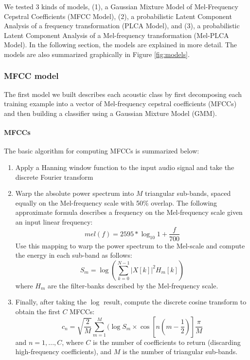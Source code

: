 We tested 3 kinds of models, (1), a Gaussian Mixture Model of Mel-Frequency Cepstral Coefficients (MFCC Model), (2), a probabilistic Latent Component Analysis of a frequency transformation (PLCA Model), and (3), a probabilistic Latent Component Analysis of a Mel-frequency transformation (Mel-PLCA Model).  In the following section, the models are explained in more detail.  The models are also summarized graphically in Figure \ref{fig:models}.

\subsubsection{MFCC model}
The first model we built describes each acoustic class by first decomposing each training example into a vector of Mel-frequency cepstral coefficients (MFCCs) and then building a classifier using a Gaussian Mixture Model (GMM).  

\paragraph{MFCCs}
The basic algorithm for computing MFCCs is summarized below:

\begin{enumerate}
\item Apply a Hanning window function to the input audio signal and take the discrete Fourier transform
\item Warp the absolute power spectrum into $M$ triangular sub-bands, spaced equally on the Mel-frequency scale with 50\% overlap.   The following approximate formula describes a frequency on the Mel-frequency scale given an input linear frequency:
\begin{equation}
mel(f) = 2595*\log_{10}{1+\frac{f}{700}}
\end{equation}
Use this mapping to warp the power spectrum to the Mel-scale and compute the energy in each sub-band as follows:
\begin{equation}
S_m = \log{\left(\sum_{k=0}^{N-1}|X[k]|^2H_m[k]\right)}
\end{equation}
where $H_m$ are the filter-banks described by the Mel-frequency scale.
\item Finally, after taking the $\log$ result, compute the discrete cosine transform to obtain the first $C$ MFCCs:
\begin{equation}
c_n = \sqrt{\frac{2}{M}}\sum_{m=1}^{M}(\log{S_m}\times\cos{[n(m-\frac{1}{2})]}\frac{\pi}{M}
\end{equation}
and $n = 1,...,C$, where $C$ is the number of coefficients to return (discarding high-frequency coefficients), and $M$ is the number of triangular sub-bands.
\end{enumerate}
 
